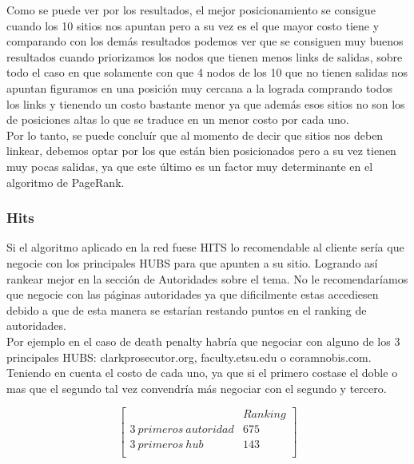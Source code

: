 Como se puede ver por los resultados, el mejor posicionamiento se consigue cuando los 10 sitios nos apuntan pero a su vez es el que mayor costo tiene y comparando con los demás resultados podemos ver que se consiguen muy buenos resultados cuando priorizamos los nodos que tienen menos links de salidas, sobre todo el caso en que solamente con que 4 nodos de los 10 que no tienen salidas nos apuntan figuramos en una posición muy cercana a la lograda comprando todos los links y tienendo un costo bastante menor ya que además esos sitios no son los de posiciones altas lo que se traduce en un menor costo por cada uno.\\
Por lo tanto, se puede concluír que al momento de decir que sitios nos deben linkear, debemos optar por los que están bien posicionados pero a su vez tienen muy pocas salidas, ya que este último es un factor muy determinante en el algoritmo de PageRank. 

\subsubsection{Hits}
Si el algoritmo aplicado en la red fuese HITS lo recomendable al cliente sería que negocie con los principales HUBS para que apunten a su sitio. Logrando así rankear mejor en la sección de Autoridades sobre el tema. 
No le recomendaríamos que negocie con las páginas autoridades ya que dificilmente estas accediesen debido a que de esta manera se estarían restando puntos en el ranking de autoridades.\\
Por ejemplo en el caso de death penalty habría que negociar con alguno de los 3 principales HUBS: clarkprosecutor.org, faculty.etsu.edu o coramnobis.com. Teniendo en cuenta el costo de cada uno, ya que si el primero costase el doble 
o mas que el segundo tal vez convendría más negociar con el segundo y tercero.

   $$ 
\begin{bmatrix}
              		            &      Ranking \\
 3\ primeros\ autoridad 		&   	675         \\
 3\ primeros\ hub				&     	143   \\
\end{bmatrix} 
$$

